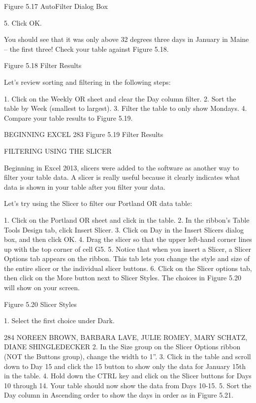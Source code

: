 Figure 5.17 AutoFilter Dialog Box


5. Click OK.

You should see that it was only above 32 degrees three days in January in Maine – the first
three! Check your table against Figure 5.18.




Figure 5.18 Filter Results

Let’s review sorting and filtering in the following steps:

1.   Click on the Weekly OR sheet and clear the Day column filter.
2.   Sort the table by Week (smallest to largest).
3.   Filter the table to only show Mondays.
4.   Compare your table results to Figure 5.19.




BEGINNING EXCEL 283
Figure 5.19 Filter Results


FILTERING USING THE SLICER

Beginning in Excel 2013, slicers were added to the software as another way to filter your table data. A
slicer is really useful because it clearly indicates what data is shown in your table after you filter your
data.

Let’s try using the Slicer to filter our Portland OR data table:

1. Click on the Portland OR sheet and click in the table.
2. In the ribbon’s Table Tools Design tab, click Insert Slicer.
3. Click on Day in the Insert Slicers dialog box, and then click OK.
4. Drag the slicer so that the upper left-hand corner lines up with the top corner of cell G5.
5. Notice that when you insert a Slicer, a Slicer Options tab appears on the ribbon. This tab lets
you change the style and size of the entire slicer or the individual slicer buttons.
6. Click on the Slicer options tab, then click on the More button next to Slicer Styles. The choices
in Figure 5.20 will show on your screen.




Figure 5.20 Slicer Styles


1. Select the first choice under Dark.

284 NOREEN BROWN, BARBARA LAVE, JULIE ROMEY, MARY SCHATZ, DIANE SHINGLEDECKER
2. In the Size group on the Slicer Options ribbon (NOT the Buttons group), change the width to 1”.
3. Click in the table and scroll down to Day 15 and click the 15 button to show only the data for
January 15th in the table.
4. Hold down the CTRL key and click on the Slicer buttons for Days 10 through 14. Your table
should now show the data from Days 10-15.
5. Sort the Day column in Ascending order to show the days in order as in Figure 5.21.




